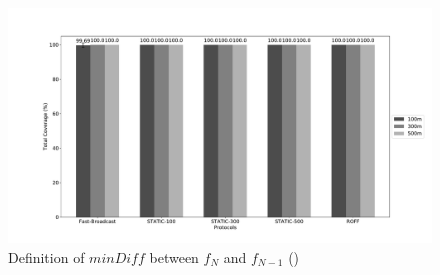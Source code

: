 \begin{figure}[H]
	\includegraphics[width=1.1\textwidth]{../../scripts/graphs/out/Platoon-15km/b0/j0-cw[32-1024]/totCoverage}
	\caption{Definition of $minDiff$ between $f_N$ and $f_{N-1}$ (\cite{6906275})}
	\label{fig:minDiff}
\end{figure}


	